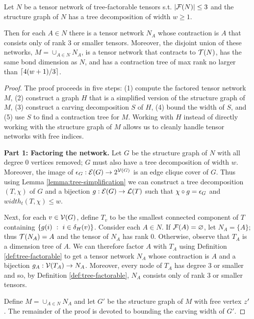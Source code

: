 \begin{theorem} \label{thm:factorable-tree}
Let $N$ be a tensor network of tree-factorable tensors s.t. $|\mathcal{F}(N)| \leq 3$ and the structure graph of $N$ has a tree decomposition of width $w \geq 1$.

Then for each $A \in N$ there is a tensor network $N_A$ whose contraction is $A$ that consists only of rank 3 or smaller tensors. Moreover, the disjoint union of these networks, $M = \cup_{A \in N} N_A$, is a tensor network that contracts to $\mathcal{T}(N)$, has the same bond dimension as $N$, and has a contraction tree of max rank no larger than $\lceil4(w+1)/3\rceil$.
\end{theorem}
\begin{proof}
The proof proceeds in five steps: (1) compute the factored tensor network $M$, (2) construct a graph $H$ that is a simplified version of the structure graph of $M$, (3) construct a carving decomposition $S$ of $H$, (4) bound the width of $S$, and (5) use $S$ to find a contraction tree for $M$. Working with $H$ instead of directly working with the structure graph of $M$ allows us to cleanly handle tensor networks with free indices.

\textbf{Part 1: Factoring the network.}
Let $G$ be the structure graph of $N$ with all degree 0 vertices removed; $G$ must also have a tree decomposition of width $w$. Moreover, the image of $\epsilon_{G}: \mathcal{E}(G) \rightarrow 2^{\mathcal{V}(G)}$ is an edge clique cover of $G$. Thus using Lemma \ref{lemma:tree-simplification} we can construct a tree decomposition $(T, \chi)$ of $G$ and a bijection $g: \mathcal{E}(G) \rightarrow \mathcal{L}(T)$ such that $\chi \circ g = \epsilon_{G}$ and $width_t(T, \chi) \leq w$.

Next, for each $v \in \mathcal{V}(G)$, define $T_v$ to be the smallest connected component of $T$ containing $\{g(i) ~:~i \in \delta_{H}(v) \}$. Consider each $A \in N$. If $\mathcal{F}(A) = \varnothing$, let $N_A = \{A\}$; thus $\mathcal{T}(N_A) = A$ and the tensor of $N_A$ has rank 0. Otherwise, observe that $T_A$ is a dimension tree of $A$. We can therefore factor $A$ with $T_A$ using Definition \ref{def:tree-factorable} to get a tensor network $N_A$ whose contraction is $A$ and a bijection $g_A: \mathcal{V}(T_A) \rightarrow N_A$. Moreover, every node of $T_A$ has degree 3 or smaller and so, by Definition \ref{def:tree-factorable}, $N_A$ consists only of rank 3 or smaller tensors.

Define $M = \cup_{A \in N} N_A$ and let $G'$ be the structure graph of $M$ with free vertex $z'$. The remainder of the proof is devoted to bounding the carving width of $G'$.


\end{proof}
